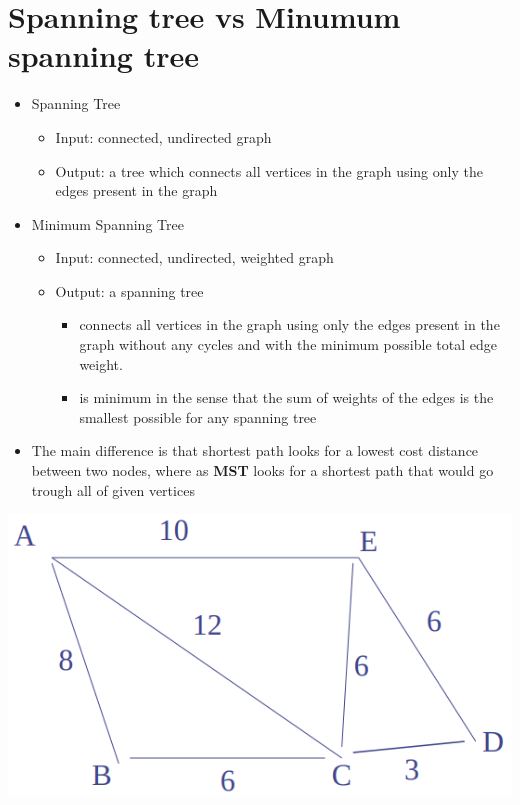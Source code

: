 \documentclass{article}
\begin{document}
\section{Spanning tree vs Minumum spanning tree}
\begin{itemize}
	\item Spanning Tree
	\begin{itemize}
		\item Input: connected, undirected graph
		\item Output: a tree which connects all vertices in the graph using only the edges present in the graph
	\end{itemize}
	\item Minimum Spanning Tree
	\begin{itemize}
		\item Input: connected, undirected, weighted graph
		\item Output: a spanning tree
		\begin{itemize}
			\item connects all vertices in the graph using only the edges present in the graph without any cycles and with the minimum possible total edge weight.
			\item is minimum in the sense that the sum of weights of the edges is the smallest possible for any spanning tree
		\end{itemize}
	\end{itemize}
	\item The main difference is that shortest path looks for a lowest cost distance between two nodes, where as \textbf{MST} looks for a shortest path that would go trough all of given vertices 
\end{itemize}
\begin{center}
	\includegraphics[scale=0.3]{graph.png}
\end{center}
\end{document}
